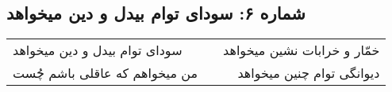 \begin{center}
\section*{شماره ۶: سودای توام بیدل و دین میخواهد}
\label{sec:006}
\begin{longtable}{l p{0.5cm} r}
سودای توام بیدل و دین میخواهد
&&
خمّار و خرابات نشین میخواهد
\\
من میخواهم که عاقلی باشم چُست
&&
دیوانگی توام چنین میخواهد
\\
\end{longtable}
\end{center}
